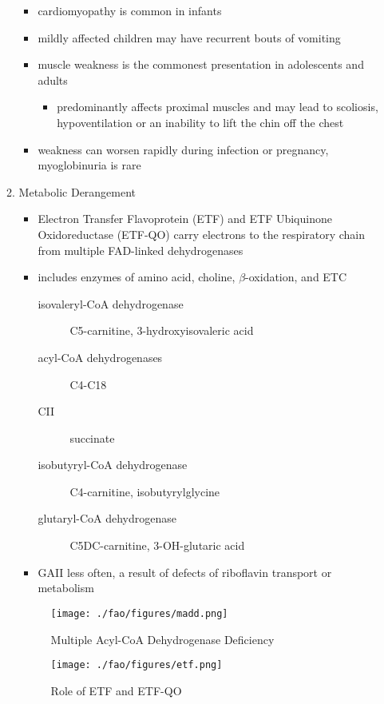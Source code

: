 \documentclass{scrartcl}
\begin{document}
\begin{enumerate}
\begin{enumerate}
\begin{itemize}
\begin{itemize}
\end{itemize}
\item cardiomyopathy is common in infants
\item mildly affected children may have recurrent bouts of vomiting
\item muscle weakness is the commonest presentation in adolescents and adults
\begin{itemize}
\item predominantly affects proximal muscles and may lead to scoliosis,
hypoventilation or an inability to lift the chin off the chest
\end{itemize}
\item weakness can worsen rapidly during infection or pregnancy, myoglobinuria is rare
\end{itemize}

\item Metabolic Derangement
\label{sec:org1262021}
\begin{itemize}
\item Electron Transfer Flavoprotein (ETF) and ETF Ubiquinone
Oxidoreductase (ETF-QO) carry electrons to the respiratory chain from
multiple FAD-linked dehydrogenases
\item includes enzymes of amino acid, choline, \(\beta\)-oxidation, and ETC
\begin{description}
\item[{isovaleryl-CoA dehydrogenase}] C5-carnitine, 3-hydroxyisovaleric acid
\item[{acyl-CoA dehydrogenases}] C4-C18
\item[{CII}] succinate
\item[{isobutyryl-CoA dehydrogenase}] C4-carnitine, isobutyrylglycine
\item[{glutaryl-CoA dehydrogenase}] C5DC-carnitine, 3-OH-glutaric acid
\end{description}

\item GAII less often, a result of defects of riboflavin transport or
metabolism
\end{itemize}

\begin{figure}[htbp]
\centering
\texttt{[image: ./fao/figures/madd.png]}
\caption{\label{fig:orgc603b63}
Multiple Acyl-CoA Dehydrogenase Deficiency}
\end{figure}

\begin{figure}[htbp]
\centering
\texttt{[image: ./fao/figures/etf.png]}
\caption{\label{fig:org63d4174}
Role of ETF and ETF-QO}
\end{figure}


\end{enumerate}
\end{enumerate}
\end{document}

